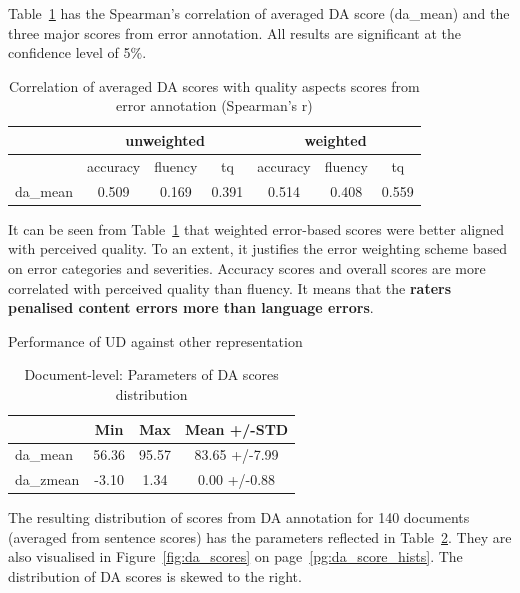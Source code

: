 Table~\ref{tab:doc_err-da_corr} has the Spearman's correlation of averaged DA score (da\_mean) and the three major scores from error annotation. All results are significant at the confidence level of 5\%.

\begin{table}[H]
	\centering
	\begin{tabular}{l|ccc|ccc}
		\toprule
				& \multicolumn{3}{c|}{unweighted} & \multicolumn{3}{c}{weighted} \\
		\midrule
		& accuracy   & fluency & tq    & accuracy & fluency & tq    \\
		\midrule
		da\_mean & 0.509      & 0.169   & 0.391 & 0.514    & 0.408   & 0.559 \\
		\bottomrule
	\end{tabular}
\caption{\label{tab:doc_err-da_corr}Correlation of averaged DA scores with quality aspects scores from error annotation (Spearman's r)}
\end{table}

It can be seen from Table~\ref{tab:doc_err-da_corr} that weighted error-based scores were better aligned with perceived quality. To an extent, it justifies the error weighting scheme based on error categories and severities. Accuracy scores and overall scores are more correlated with perceived quality than fluency. It means that the \textbf{raters penalised content errors more than language errors}. 

\begin{table}[H]Performance of UD against other representation
	\centering
	\begin{tabular}{l|ccc}
		\toprule
		& Min   & Max    & Mean +/-\gls{STD}          \\
		\midrule
		da\_mean  & 56.36 & 95.57 & 83.65 +/-7.99 \\
		da\_zmean & -3.10 & 1.34  & 0.00 +/-0.88 \\
		\bottomrule
	\end{tabular}
	\caption{\label{tab:doc_da_dist}Document-level: Parameters of DA scores distribution}
\end{table}

The resulting distribution of scores from DA annotation for 140 documents (averaged from sentence scores) has the parameters reflected in Table~\ref{tab:doc_da_dist}. They are also visualised in Figure~\ref{fig:da_scores} on page~\ref{pg:da_score_hists}. The distribution of DA scores is skewed to the right. 

